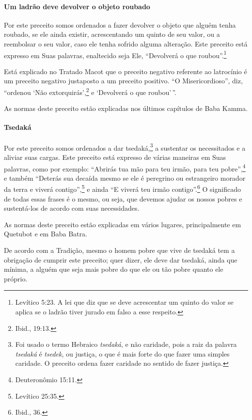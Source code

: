 \paragraph{Um ladrão deve devolver o objeto roubado}

Por este preceito somos ordenados a fazer devolver o objeto que alguém
tenha roubado, se ele ainda existir, acrescentando um quinto de seu
valor, ou a reembolsar o seu valor, caso ele tenha sofrido alguma
alteração. Este preceito está expresso em Suas palavras, enaltecido seja Ele,
``Devolverá o que roubou''.\footnote{Levítico 5:23. A lei que diz que se deve acrescentar um quinto do valor se aplica se
  o ladrão tiver jurado em falso a esse respeito.}

Está explicado no Tratado Macot que o preceito negativo referente
ao latrocínio é um preceito negativo justaposto a um preceito positivo.
``O Misericordioso'', diz, ``ordenou `Não extorquirás',\footnote{Ibid., 19:13.} e
`Devolverá o que roubou'\,''.

As normas deste preceito estão explicadas nos últimos capítulos de Baba Kamma.

\paragraph{Tsedaká}

Por este preceito somos ordenados a dar tsedaká,\footnote{Foi usado o termo Hebraico \emph{tsedaká}, e não caridade, pois a raiz da
  palavra \emph{tsedaká} é \emph{tsedek}, ou justiça, o que é mais forte do
  que fazer uma simples caridade. O preceito ordena fazer caridade no
  sentido de fazer justiça.} a sustentar
os necessitados e a aliviar suas cargas. Este preceito está expresso de
várias maneiras em Suas palavras, como por exemplo: ``Abrirás tua mão para teu
irmão, para teu pobre'',\footnote{Deuteronômio 15:11.} e também ``Deterás sua decaída
mesmo se ele é peregrino ou estrangeiro morador da terra e viverá
contigo'',\footnote{Levítico 25:35.} e ainda ``E viverá teu irmão contigo''.\footnote{Ibid., 36.} O significado de todas essas frases é o mesmo, ou seja, que
devemos ajudar os nossos pobres e sustentá-los de acordo com suas
necessidades.

As normas deste preceito estão explicadas em vários lugares,
principalmente em Quetubot e em Baba Batra.

De acordo com a Tradição, mesmo o homem pobre que vive de tsedaká
tem a obrigação de cumprir este preceito; quer dizer, ele deve dar
tsedaká, ainda que mínima, a alguém que seja mais pobre do que ele
ou tão pobre quanto ele próprio.

